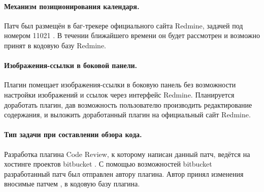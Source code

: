 \paragraph{Механизм позиционирования календаря.}
Патч был размещён в баг-трекере официального сайта Redmine, задачей под номером
11021 \cite{calendar-bug}. В течении ближайшего времени он будет рассмотрен и
возможно принят в кодовую базу Redmine.

\paragraph{Изображения-ссылки в боковой панели.}
Плагин помещает изображения-ссылки в боковую панель без возможности настройки
изображений и ссылок через интерфейс Redmine. Планируется доработать плагин,
дав возможность пользователю производить редактирование содержания, и выложить
доработанный плагин на официальный сайт Redmine.

\paragraph{Тип задачи при составлении обзора кода.}
Разработка плагина Code Review, к которому написан данный патч, ведётся на
хостинге проектов bitbucket \cite{bitbucket}. С помощью возможностей bitbucket
разработанный патч был отправлен автору плагина. Автор принял изменения
вносимые патчем \cite{pull-request}, в кодовую базу плагина.


